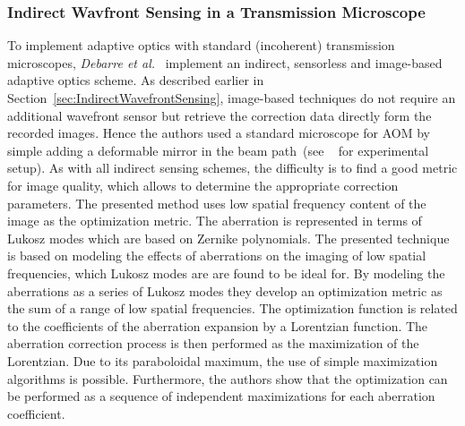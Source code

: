 \subsubsection{Indirect Wavfront Sensing in a Transmission Microscope}
\label{sec:TransmissionMicroscope}

To implement adaptive optics with standard (incoherent) transmission microscopes, \emph{Debarre et al.}~\cite{wide_AOM_loew_freq} implement an indirect, sensorless and image-based adaptive optics scheme. As described earlier in Section~\ref{sec:IndirectWavefrontSensing}, image-based techniques do not require an additional wavefront sensor but retrieve the correction data directly form the recorded images. Hence the authors used a standard microscope for AOM by simple adding a deformable mirror in the beam path~(see ~\cite{wide_AOM_loew_freq} for experimental setup). As with all indirect sensing schemes, the difficulty is to find a good metric for image quality, which allows to determine the appropriate correction parameters. The presented method uses low spatial frequency content of the image as the optimization metric. The aberration is represented in terms of Lukosz modes which are based on Zernike polynomials. The presented technique is based on modeling the effects of aberrations on the imaging of low spatial frequencies, which Lukosz modes are are found to be ideal for. By modeling the aberrations as a series of Lukosz modes they develop an optimization metric as the sum of a range of low spatial frequencies. The optimization function is related to the coefficients of the aberration expansion by a Lorentzian function. The aberration correction process is then performed as the maximization of the Lorentzian. Due to its paraboloidal maximum, the use of simple maximization algorithms is possible. Furthermore, the authors show that the optimization can be performed as a sequence of independent maximizations for each aberration coefficient.


